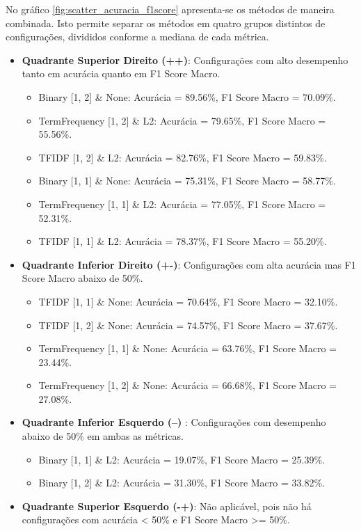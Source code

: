 No gráfico \ref{fig:scatter_acuracia_f1score} apresenta-se os métodos de maneira combinada.  Isto permite separar os métodos em quatro grupos distintos de configurações, divididos conforme a mediana de cada métrica. 

\begin{itemize}
    \item \textbf{Quadrante Superior Direito (++)}: Configurações com alto desempenho tanto em acurácia quanto em F1 Score Macro.
    \begin{itemize}
        \item Binary [1, 2] \& None: Acurácia = 89.56\%, F1 Score Macro = 70.09\%.
        \item TermFrequency [1, 2] \& L2: Acurácia = 79.65\%, F1 Score Macro = 55.56\%.
        \item TFIDF [1, 2] \& L2: Acurácia = 82.76\%, F1 Score Macro = 59.83\%.
        \item Binary [1, 1] \& None: Acurácia = 75.31\%, F1 Score Macro = 58.77\%.
        \item TermFrequency [1, 1] \& L2: Acurácia = 77.05\%, F1 Score Macro = 52.31\%.
        \item TFIDF [1, 1] \& L2: Acurácia = 78.37\%, F1 Score Macro = 55.20\%.
    \end{itemize}

    \item \textbf{Quadrante Inferior Direito (+-)}: Configurações com alta acurácia mas F1 Score Macro abaixo de 50\%.
    \begin{itemize}
        \item TFIDF [1, 1] \& None: Acurácia = 70.64\%, F1 Score Macro = 32.10\%.
        \item TFIDF [1, 2] \& None: Acurácia = 74.57\%, F1 Score Macro = 37.67\%.
        \item TermFrequency [1, 1] \& None: Acurácia = 63.76\%, F1 Score Macro = 23.44\%.
        \item TermFrequency [1, 2] \& None: Acurácia = 66.68\%, F1 Score Macro = 27.08\%.
    \end{itemize}

    \item \textbf{Quadrante Inferior Esquerdo (--) }: Configurações com desempenho abaixo de 50\% em ambas as métricas.
    \begin{itemize}
        \item Binary [1, 1] \& L2: Acurácia = 19.07\%, F1 Score Macro = 25.39\%.
        \item Binary [1, 2] \& L2: Acurácia = 31.30\%, F1 Score Macro = 33.82\%.
    \end{itemize}

    \item \textbf{Quadrante Superior Esquerdo (-+)}: Não aplicável, pois não há configurações com acurácia < 50\% e F1 Score Macro >= 50\%.
\end{itemize}


